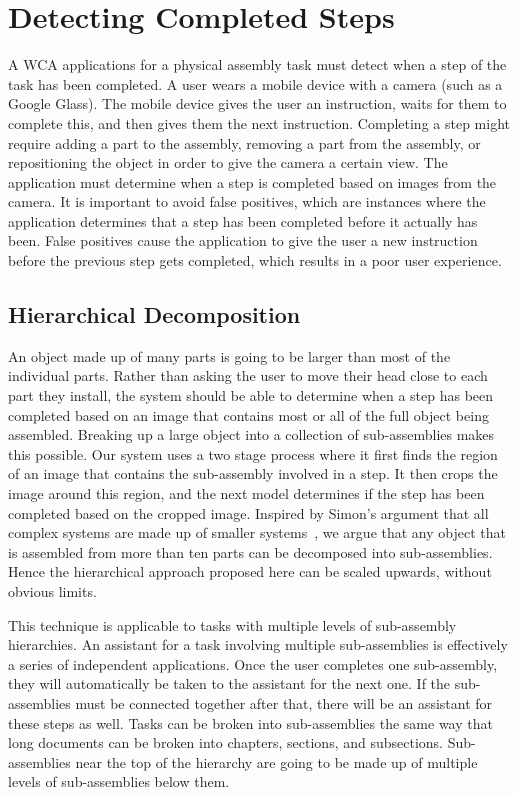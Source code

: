 \chapter{Detecting Completed Steps}\label{chap:detection}

A WCA applications for a physical assembly task must detect when a step of the
task has been completed.
A user wears a mobile device with a camera (such as a Google Glass).
The mobile
device gives the user an instruction, waits for them to complete this, and then
gives them the next instruction.
Completing a step might require adding a part to the assembly,
removing a part from the assembly, or repositioning the object in order to give
the camera a certain view.
The application must determine when a step is completed
based on images from the camera.
It is important to avoid false positives, which are instances where the
application determines that a step has been completed before it actually has
been.
False positives cause the application to give the user a new instruction before
the previous step gets completed, which results in a poor user experience.

\section{Hierarchical Decomposition}

An object made up of many parts is going to be larger than most of the
individual parts.
Rather than asking the user to move their head close to each part
they install, the system should be able to determine when a step has been
completed based on an image that contains most or all of the full object being
assembled.
Breaking up a large object into a collection of sub-assemblies makes
this possible.
Our system uses a two stage process where it first finds the
region of an image that contains the sub-assembly involved in a step. It then
crops the image around this region, and the next model determines if the step
has been completed based on the cropped image. Inspired by Simon's argument that
all complex systems are made up of smaller systems~\cite{Simon1991}, we argue
that any object that is assembled from more than ten parts can be decomposed
into sub-assemblies.
Hence the hierarchical approach proposed here can be scaled upwards, without
obvious limits.

This technique is applicable to tasks
with multiple levels of sub-assembly hierarchies.
An assistant for a task involving multiple sub-assemblies is effectively a
series of independent applications. Once the user completes one sub-assembly,
they will automatically be taken to the assistant for the next one.
If the
sub-assemblies must be connected together after that, there will be an assistant
for these steps as well.
Tasks can be broken into sub-assemblies the same way that long documents can be
broken into chapters, sections, and subsections.
Sub-assemblies near the top of the hierarchy are going to be made up of multiple
levels of sub-assemblies below them.

